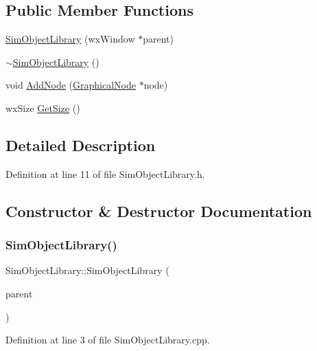 \subsection*{Public Member Functions}
\begin{DoxyCompactItemize}
\item 
\hyperlink{class_sim_object_library_af0a2f868731e4b807865b88c8e89fed2}{Sim\+Object\+Library} (wx\+Window $\ast$parent)
\item 
\hyperlink{class_sim_object_library_acb3952bfbbb6ad77f8ce34883aa4a23d}{$\sim$\+Sim\+Object\+Library} ()
\item 
void \hyperlink{class_sim_object_library_a7e99f1b55ecf5e894a8b83228bc74b0e}{Add\+Node} (\hyperlink{class_graphical_node}{Graphical\+Node} $\ast$node)
\item 
wx\+Size \hyperlink{class_sim_object_library_af66daff6ed6fcecb0509e47a97847986}{Get\+Size} ()
\end{DoxyCompactItemize}


\subsection{Detailed Description}


Definition at line 11 of file Sim\+Object\+Library.\+h.



\subsection{Constructor \& Destructor Documentation}
\mbox{\label{class_sim_object_library_af0a2f868731e4b807865b88c8e89fed2}} 
\subsubsection{\texorpdfstring{Sim\+Object\+Library()}{SimObjectLibrary()}}
{\footnotesize\ttfamily Sim\+Object\+Library\+::\+Sim\+Object\+Library (\begin{DoxyParamCaption}\item[{wx\+Window $\ast$}]{parent }\end{DoxyParamCaption})}



Definition at line 3 of file Sim\+Object\+Library.\+cpp.

